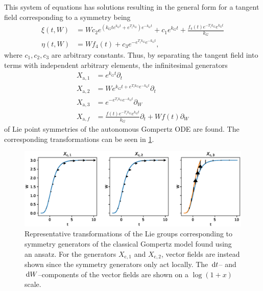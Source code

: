 This system of equations has solutions resulting in the general form for a tangent field corresponding to a symmetry being
\begin{align*}
  \xi{\left(t,W \right)} &= W c_{2} e^{\left(k_{G} t e^{k_{G} t} + e^{T_{i} k_{G}}\right) e^{- k_{G} t}} + c_{1} e^{k_{G} t} + \frac{f_{4}{\left(t \right)} e^{- T_{i} k_{G}} e^{k_{G} t}}{k_{G}} \\
  \eta{\left(t,W \right)} &= W f_{4}{\left(t \right)} + c_{3} e^{- e^{T_{i} k_{G}} e^{- k_{G} t}},
\end{align*}
where \(c_1, c_2, c_3\) are arbitrary constants.
Thus, by separating the tangent field into terms with independent arbitrary elements, the infinitesimal generators
\begin{align*}
  X_{\text{a},1} &= e^{k_{G} t} \partial_t \\
  X_{\text{a},2} &= W e^{k_{G} t + e^{T_{i} k_{G}} e^{- k_{G} t}} \partial_t \\
  X_{\text{a},3} &= e^{- e^{T_{i} k_{G}} e^{- k_{G} t}} \partial_W \\
  X_{\text{a},f} &= \frac{f{\left(t \right)} e^{- T_{i} k_{G}} e^{k_{G} t}}{k_{G}} \partial_t + W f{\left(t \right)} \partial_W
\end{align*}
of Lie point symmetries of the autonomous Gompertz ODE  are found.
The corresponding transformations can be seen in \cref{fig:gompertz-classical-ansatz}.
\begin{figure}
  \centering
  \includegraphics[width=.96\textwidth]{images/gompertz-classical-ansatz}
  \caption{
    Representative transformations of the Lie groups corresponding to symmetry generators of the classical Gompertz model found using an ansatz.
    For the generators \(X_{\text{c},1}\) and \(X_{\text{c},2}\), vector fields are instead shown since the symmetry generators only act locally.
    The \(\dl t\)-- and \(\dl W\)--components of the vector fields are shown on a \(\log(1 + x)\) scale.
  }
  \label{fig:gompertz-classical-ansatz}
\end{figure}

